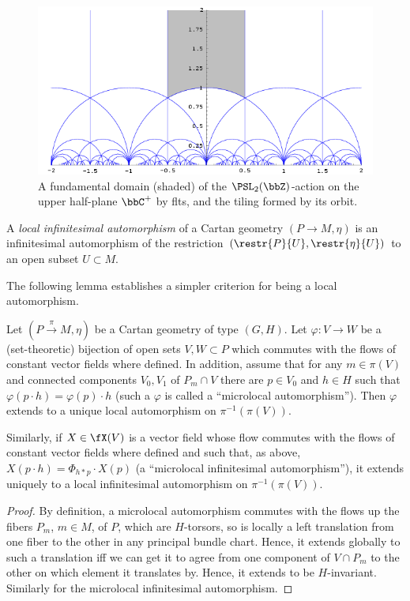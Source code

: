 \begin{figure}[tp]
    \centering
    \includegraphics[scale=0.4]{figures/fundamental-domain.png}
    \caption{A fundamental domain (shaded) of the $\PSL_2(\bbZ)$-action on the upper half-plane $\bbC^+$ by \glspl{flt}, and the tiling formed by its orbit.\label{fig fund domain}}
\end{figure}



\begin{defn}
    A \emph{local infinitesimal automorphism} of a Cartan geometry $(P\to M,\eta)$ is an infinitesimal automorphism of the restriction $(\restr{P}{U},\restr{\eta}{U})$ to an open subset $U\subset M$.
\end{defn}

The following lemma establishes a simpler criterion for being a local automorphism.

\begin{lem}
    Let $(P\overset{\pi}{\to} M,\eta)$ be a Cartan geometry of type $(G,H)$. Let $\varphi:V\to W$ be a (set-theoretic) bijection of open sets $V,W\subset P$ which commutes with the flows of constant vector fields where defined. In addition, assume that for any $m\in \pi(V)$ and connected components $V_0,V_1$ of $P_m\cap V$ there are $p\in V_0$ and $h\in H$ such that $\varphi(p\cdot h)=\varphi(p)\cdot h$ (such a $\varphi$ is called a ``microlocal automorphism''). Then $\varphi$ extends to a unique local automorphism on $\pi^{-1}(\pi(V))$. 

    Similarly, if $X\in\fX(V)$ is a vector field whose flow commutes with the flows of constant vector fields where defined and such that, as above, $X(p\cdot h)=\Phi_{h\ast p}\cdot X(p)$ (a ``microlocal infinitesimal automorphism''), it extends uniquely to a local infinitesimal automorphism on $\pi^{-1}(\pi(V))$. 
\end{lem}
\begin{proof}
    By definition, a microlocal automorphism commutes with the flows up the fibers $P_m$, $m\in M$, of $P$, which are $H$-torsors, so is locally a left translation from one fiber to the other in any principal bundle chart. Hence, it extends globally to such a translation iff we can get it to agree from one component of $V\cap P_m$ to the other on which element it translates by. Hence, it extends to be $H$-invariant. Similarly for the microlocal infinitesimal automorphism.
\end{proof}

